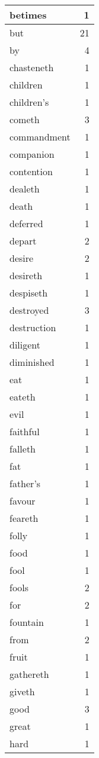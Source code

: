 \begin{center}
\begin{longtable}{l|r}
betimes & 1\\ \hline 
but & 21\\ \hline 
by & 4\\ \hline 
chasteneth & 1\\ \hline 
children & 1\\ \hline 
children's & 1\\ \hline 
cometh & 3\\ \hline 
commandment & 1\\ \hline 
companion & 1\\ \hline 
contention & 1\\ \hline 
dealeth & 1\\ \hline 
death & 1\\ \hline 
deferred & 1\\ \hline 
depart & 2\\ \hline 
desire & 2\\ \hline 
desireth & 1\\ \hline 
despiseth & 1\\ \hline 
destroyed & 3\\ \hline 
destruction & 1\\ \hline 
diligent & 1\\ \hline 
diminished & 1\\ \hline 
eat & 1\\ \hline 
eateth & 1\\ \hline 
evil & 1\\ \hline 
faithful & 1\\ \hline 
falleth & 1\\ \hline 
fat & 1\\ \hline 
father's & 1\\ \hline 
favour & 1\\ \hline 
feareth & 1\\ \hline 
folly & 1\\ \hline 
food & 1\\ \hline 
fool & 1\\ \hline 
fools & 2\\ \hline 
for & 2\\ \hline 
fountain & 1\\ \hline 
from & 2\\ \hline 
fruit & 1\\ \hline 
gathereth & 1\\ \hline 
giveth & 1\\ \hline 
good & 3\\ \hline 
great & 1\\ \hline 
hard & 1\\ \hline 

\end{longtable}
\end{center}
